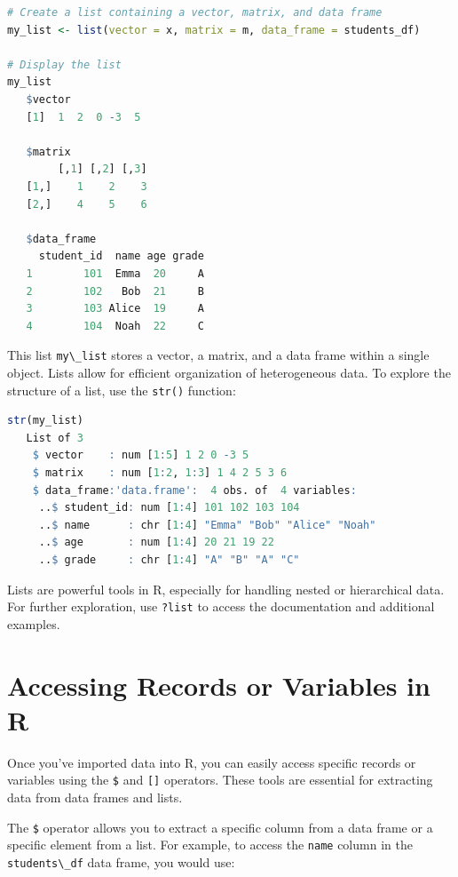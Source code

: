 \documentclass[
  11pt,
]{book}
\newcommand{\passthrough}[1]{#1}
\theoremstyle{definition}
\theoremstyle{definition}
\theoremstyle{definition}
\theoremstyle{definition}
\theoremstyle{remark}
\begin{document}
\begin{lstlisting}[language=R]
# Create a list containing a vector, matrix, and data frame
my_list <- list(vector = x, matrix = m, data_frame = students_df)

# Display the list
my_list
   $vector
   [1]  1  2  0 -3  5
   
   $matrix
        [,1] [,2] [,3]
   [1,]    1    2    3
   [2,]    4    5    6
   
   $data_frame
     student_id  name age grade
   1        101  Emma  20     A
   2        102   Bob  21     B
   3        103 Alice  19     A
   4        104  Noah  22     C
\end{lstlisting}

This list \passthrough{\lstinline!my\_list!} stores a vector, a matrix, and a data frame within a single object. Lists allow for efficient organization of heterogeneous data. To explore the structure of a list, use the \passthrough{\lstinline!str()!} function:

\begin{lstlisting}[language=R]
str(my_list)
   List of 3
    $ vector    : num [1:5] 1 2 0 -3 5
    $ matrix    : num [1:2, 1:3] 1 4 2 5 3 6
    $ data_frame:'data.frame':  4 obs. of  4 variables:
     ..$ student_id: num [1:4] 101 102 103 104
     ..$ name      : chr [1:4] "Emma" "Bob" "Alice" "Noah"
     ..$ age       : num [1:4] 20 21 19 22
     ..$ grade     : chr [1:4] "A" "B" "A" "C"
\end{lstlisting}

Lists are powerful tools in R, especially for handling nested or hierarchical data. For further exploration, use \passthrough{\lstinline!?list!} to access the documentation and additional examples.

\section{Accessing Records or Variables in R}\label{accessing-records-or-variables-in-r}

Once you've imported data into R, you can easily access specific records or variables using the \passthrough{\lstinline!$!} and \passthrough{\lstinline![]!} operators. These tools are essential for extracting data from data frames and lists.

The \passthrough{\lstinline!$!} operator allows you to extract a specific column from a data frame or a specific element from a list. For example, to access the \passthrough{\lstinline!name!} column in the \passthrough{\lstinline!students\_df!} data frame, you would use:
\end{document}

